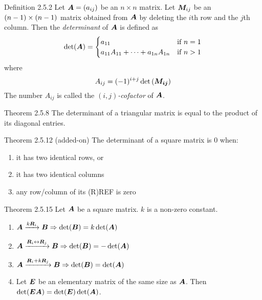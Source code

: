 \documentclass[10pt,portrait]{article}
\begin{document}
\begin{multicols}{2}
\begin{justifying}
\begin{namedthm*}{Definition 2.5.2}
    Let \(\bm{A} = \left(a_{ij}\right)\) be an \(n \times n\) matrix. Let \(\bm{M}_{ij}\) be an \(\nobreak{(n - 1)\times (n - 1)}\) matrix obtained from \(\bm{A}\) by deleting the \(i\)th row and the \(j\)th column. Then the \textit{determinant} of \(\bm{A}\) is defined as
    \[
        \det(\bm{A}) =
            \begin{cases}
                a_{11} & \text{if \(n = 1\)} \\
                a_{11}A_{11} + \cdots + a_{1n}A_{1n} & \text{if \(n > 1\)}
            \end{cases}
    \]
    where
    \[
        A_{ij} = (-1)^{i + j} \det\left(\bm{M_{ij}}\right)
    \]
    The number \(A_{ij}\) is called the \((i, j)\)\textit{-cofactor} of \(\bm{A}\).
\end{namedthm*}

\begin{namedthm*}{Theorem 2.5.8}
    The determinant of a triangular matrix is equal to the product of its diagonal entries.
\end{namedthm*}

\begin{namedthm*}{Theorem 2.5.12 (added-on)}
	The determinant of a square matrix is 0 when:
	\begin{enumerate}
		\item it has two identical rows, or
		\item it has two identical columns
		\item any row/column of its (R)REF is zero
	\end{enumerate}
\end{namedthm*}

\begin{namedthm*}{Theorem 2.5.15}
    Let \(\bm{A}\) be a square matrix. \(k\) is a non-zero constant.
    \begin{enumerate}
    	\item \(\bm{A} \xrightarrow{k\bm{R}_i} \bm{B} \Rightarrow \det(\bm{B}) = k\det(\bm{A})\)
    	\item \(\bm{A} \xrightarrow{\bm{R}_i \leftrightarrow \bm{R}_j} \bm{B} \Rightarrow \det(\bm{B}) = -\det(\bm{A})\)
    	\item \(\bm{A} \xrightarrow{\bm{R}_i + k\bm{R}_j} \bm{B} \Rightarrow \det(\bm{B}) = \det(\bm{A})\)
        \item Let \(\bm{E}\) be an elementary matrix of the same size as \(\bm{A}\). Then \(\det(\bm{EA}) = \det(\bm{E})\det(\bm{A})\).
    \end{enumerate}
\end{namedthm*}


\end{justifying}
\end{multicols}
\end{document}
